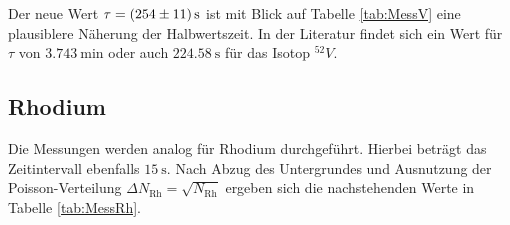 Der neue Wert $\tau = \SI{254\pm11}{\second}$ ist mit Blick auf Tabelle \ref{tab:MessV} eine plausiblere Näherung der Halbwertszeit.
In der Literatur\cite{perTable} findet sich ein Wert für $\tau$ von $\SI{3.743}{\minute}$ oder auch $\SI{224.58}{\second}$ für das Isotop $^{52}V$.

\subsection{Rhodium}

Die Messungen werden analog für Rhodium durchgeführt. Hierbei beträgt das Zeitintervall ebenfalls $\SI{15}{\second}$.
Nach Abzug des Untergrundes und Ausnutzung der Poisson-Verteilung $\Delta N_\text{Rh}=\sqrt{N_\text{Rh}}$ ergeben sich die nachstehenden Werte in Tabelle \ref{tab:MessRh}.

